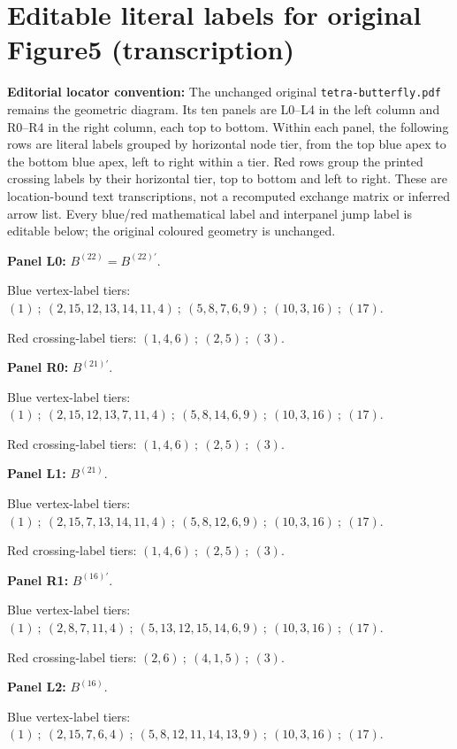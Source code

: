 \documentclass[11pt]{article}
\numberwithin{equation}{section}
\numberwithin{equation}{section}
\begin{document}
\section*{Editable literal labels for original Figure5 (transcription)}
\noindent\textbf{Editorial locator convention:} The unchanged original \texttt{tetra-butterfly.pdf} remains the geometric diagram. Its ten panels are L0--L4 in the left column and R0--R4 in the right column, each top to bottom. Within each panel, the following rows are literal labels grouped by horizontal node tier, from the top blue apex to the bottom blue apex, left to right within a tier. Red rows group the printed crossing labels by their horizontal tier, top to bottom and left to right. These are location-bound text transcriptions, not a recomputed exchange matrix or inferred arrow list. Every blue/red mathematical label and interpanel jump label is editable below; the original coloured geometry is unchanged.\par
\medskip\noindent\textbf{Panel L0:} $B^{(22)}=B^{(22)\prime}$.\par
\noindent Blue vertex-label tiers: $(1)\ ;\ (2,15,12,13,14,11,4)\ ;\ (5,8,7,6,9)\ ;\ (10,3,16)\ ;\ (17)$.\par
\noindent Red crossing-label tiers: $(1,4,6)\ ;\ (2,5)\ ;\ (3)$.\par
\medskip\noindent\textbf{Panel R0:} $B^{(21)\prime}$.\par
\noindent Blue vertex-label tiers: $(1)\ ;\ (2,15,12,13,7,11,4)\ ;\ (5,8,14,6,9)\ ;\ (10,3,16)\ ;\ (17)$.\par
\noindent Red crossing-label tiers: $(1,4,6)\ ;\ (2,5)\ ;\ (3)$.\par
\medskip\noindent\textbf{Panel L1:} $B^{(21)}$.\par
\noindent Blue vertex-label tiers: $(1)\ ;\ (2,15,7,13,14,11,4)\ ;\ (5,8,12,6,9)\ ;\ (10,3,16)\ ;\ (17)$.\par
\noindent Red crossing-label tiers: $(1,4,6)\ ;\ (2,5)\ ;\ (3)$.\par
\medskip\noindent\textbf{Panel R1:} $B^{(16)\prime}$.\par
\noindent Blue vertex-label tiers: $(1)\ ;\ (2,8,7,11,4)\ ;\ (5,13,12,15,14,6,9)\ ;\ (10,3,16)\ ;\ (17)$.\par
\noindent Red crossing-label tiers: $(2,6)\ ;\ (4,1,5)\ ;\ (3)$.\par
\medskip\noindent\textbf{Panel L2:} $B^{(16)}$.\par
\noindent Blue vertex-label tiers: $(1)\ ;\ (2,15,7,6,4)\ ;\ (5,8,12,11,14,13,9)\ ;\ (10,3,16)\ ;\ (17)$.\par
\end{document}
